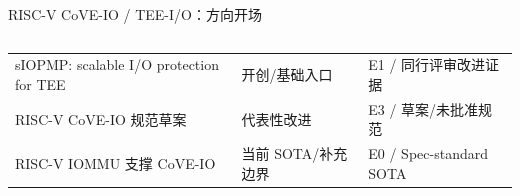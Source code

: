 \begin{frame}[t,shrink=6]{RISC-V CoVE-IO / TEE-I/O：方向开场}
\begin{columns}[T,totalwidth=\textwidth]
\begin{column}{0.49\textwidth}
{\begin{minipage}[t]{0.97\linewidth}
\begin{minipage}{0.92\linewidth}
{\begin{tabularx}{\linewidth}{@{}YYY@{}}
\midrule
sIOPMP: scalable I/O protection for TEE & 开创/基础入口 & E1 / 同行评审改进证据 \\
RISC-V CoVE-IO 规范草案 & 代表性改进 & E3 / 草案/未批准规范 \\
RISC-V IOMMU 支撑 CoVE-IO & 当前 SOTA/补充边界 & E0 / Spec-standard SOTA \\
\bottomrule
\end{tabularx}
}
    \end{minipage}
    \vspace{1mm}
  \end{minipage}}
  \end{column}
\end{columns}
\end{frame}


